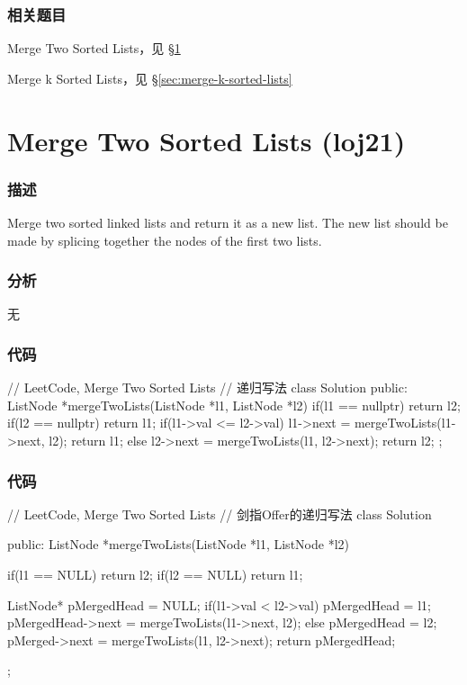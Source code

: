 \subsubsection{相关题目}
\begindot
\item Merge Two Sorted Lists，见 \S \ref{sec:merge-two-sorted-lists}
\item Merge k Sorted Lists，见 \S \ref{sec:merge-k-sorted-lists}
\myenddot


\section{Merge Two Sorted Lists (loj21)} %
\label{sec:merge-two-sorted-lists}


\subsubsection{描述}
Merge two sorted linked lists and return it as a new list. The new list should be made by splicing together the nodes of the first two lists.


\subsubsection{分析}
无

\subsubsection{代码}
\begin{Code}
// LeetCode, Merge Two Sorted Lists
// 递归写法
class Solution {
    public:
    ListNode *mergeTwoLists(ListNode *l1, ListNode *l2) {
        if(l1 == nullptr) return l2;
        if(l2 == nullptr) return l1;
        if(l1->val <= l2->val) {
            l1->next = mergeTwoLists(l1->next, l2);
            return l1;
        } else {
            l2->next = mergeTwoLists(l1, l2->next);
            return l2;
        }
    }
};
\end{Code}

\subsubsection{代码}
\begin{Code}
// LeetCode, Merge Two Sorted Lists
// 剑指Offer的递归写法
class Solution {
public:
    ListNode *mergeTwoLists(ListNode *l1, ListNode *l2) {
        if(l1 == NULL) return l2;
        if(l2 == NULL) return l1;
        
        ListNode* pMergedHead = NULL;
        if(l1->val < l2->val) {
            pMergedHead = l1;
            pMergedHead->next = mergeTwoLists(l1->next, l2);   
        } else {
            pMergedHead = l2;
            pMerged->next = mergeTwoLists(l1, l2->next);   
        }
        return pMergedHead;
    }
};
\end{Code}

